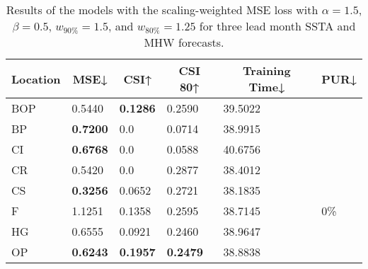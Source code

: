 \documentclass[11pt, a4paper]{article}
\begin{document}
\begin{table}[H]
\centering
\small
\caption{Results of the models with the scaling-weighted MSE loss with $\alpha=1.5$, $\beta=0.5$, $w_{90\%}=1.5$, and $w_{80\%}=1.25$ for three lead month SSTA and MHW forecasts.}
\begin{tabular}{llllll}
\multicolumn{1}{c}{\textbf{Location}} & \multicolumn{1}{c}{\textbf{MSE↓}} & \multicolumn{1}{c}{\textbf{CSI↑}} & \multicolumn{1}{c}{\textbf{CSI 80↑}} & \multicolumn{1}{c}{\textbf{Training Time↓}} & \multicolumn{1}{c}{\textbf{PUR↓}} \\ \hline
BOP                         & 0.5440                            & \textbf{0.1286}                   & 0.2590                               & 39.5022                                     &                                   \\
BP                        & \textbf{0.7200}                   & 0.0                               & 0.0714                               & 38.9915                                     &                                   \\
CI                        & \textbf{0.6768}                   & 0.0                               & 0.0588                               & 40.6756                                     &                                   \\
CR                           & 0.5420                            & 0.0                               & 0.2877                               & 38.4012                                     &                                   \\
CS                           & \textbf{0.3256}                   & 0.0652                            & 0.2721                               & 38.1835                                     &                                   \\
F                             & 1.1251                            & 0.1358                            & 0.2595                               & 38.7145                                     & 0\%                               \\
HG                          & 0.6555                            & 0.0921                            & 0.2460                               & 38.9647                                     &                                   \\
OP                       & \textbf{0.6243}                   & \textbf{0.1957}                   & \textbf{0.2479}                      & 38.8838                                     &                                   \\

\end{tabular}
\end{table}
\end{document}
